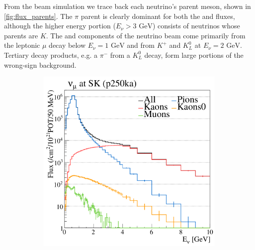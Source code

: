 From the beam simulation we trace back each neutrino's parent meson, shown in \autoref{fig:flux_parents}. The $\pi$ parent is clearly dominant for both the \numu and \numubar fluxes, although the higher energy portion ($E_\nu > 3\text{ GeV}$) consists of neutrinos whose parents are $K$. The \nue and \nuebar components of the neutrino beam come primarily from the leptonic $\mu$ decay below $E_\nu = 1 \text{ GeV}$ and from $K^+$ and $K^0_L$ at $E_\nu = 2 \text{ GeV}$. Tertiary decay products, e.g. a $\pi^-$ from a $K^0_L$ decay, form large portions of the wrong-sign background.
\begin{figure}[h]
	\begin{subfigure}[t]{0.32\textwidth}
		\includegraphics[width=\textwidth, trim={0mm 0mm 0mm 0mm}, clip,page=1]{figures/det_chap/beam/numu_sk_parents}
	\end{subfigure}
	\begin{subfigure}[t]{0.32\textwidth}

\end{subfigure}
\end{figure}
